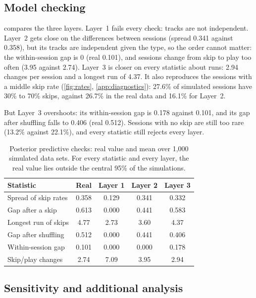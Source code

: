 \documentclass[12pt]{article}
\begin{document}
\subsection{Model checking}

 compares the three layers. Layer~1 fails every check: tracks are not independent. Layer~2 gets close on the differences between sessions (spread 0.341 against 0.358), but its tracks are independent given the type, so the order cannot matter: the within-session gap is 0 (real 0.101), and sessions change from skip to play too often (3.95 against 2.74). Layer~3 is closer on every statistic about runs: 2.94 changes per session and a longest run of 4.37. It also reproduces the sessions with a middle skip rate (\cref{fig:rates}, \cref{app:diagnostics}): 27.6\% of simulated sessions have 30\% to 70\% skips, against 26.7\% in the real data and 16.1\% for Layer~2.

But Layer~3 overshoots: its within-session gap is 0.178 against 0.101, and its gap after shuffling falls to 0.406 (real 0.512). Sessions with no skip are still too rare (13.2\% against 22.1\%), and every statistic still rejects every layer.

\begin{table}[h]
\centering
\small
\caption{Posterior predictive checks: real value and mean over 1{,}000 simulated data sets. For every statistic and every layer, the real value lies outside the central 95\% of the simulations.}
\label{tab:checks}
\begin{tabular}{@{}lcccc@{}}
\toprule
Statistic & Real & Layer 1 & Layer 2 & Layer 3 \\
\midrule
Spread of skip rates & 0.358 & 0.129 & 0.341 & 0.332 \\
Gap after a skip & 0.613 & 0.000 & 0.441 & 0.583 \\
Longest run of skips & 4.77 & 2.73 & 3.60 & 4.37 \\
Gap after shuffling & 0.512 & 0.000 & 0.441 & 0.406 \\
Within-session gap & 0.101 & 0.000 & 0.000 & 0.178 \\
Skip/play changes & 2.74 & 7.09 & 3.95 & 2.94 \\
\bottomrule
\end{tabular}
\end{table}



\subsection{Sensitivity and additional analysis}
\end{document}
